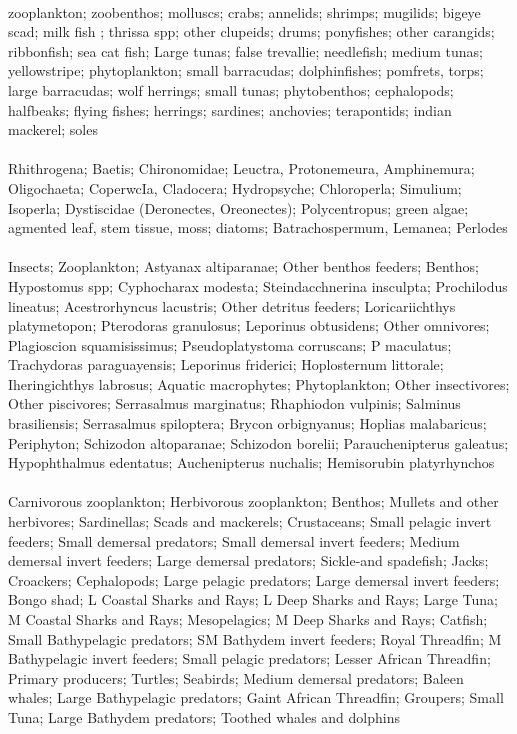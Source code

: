 \fullhline
\hline
{} \\
\hline
zooplankton; zoobenthos; molluscs; crabs; annelids; shrimps; mugilids; bigeye scad; milk fish ; thrissa spp; other clupeids; drums; ponyfishes; other carangids; ribbonfish; sea cat fish; Large tunas; false trevallie; needlefish; medium tunas; yellowstripe; phytoplankton; small barracudas; dolphinfishes; pomfrets, torps; large barracudas; wolf herrings; small tunas; phytobenthos; cephalopods; halfbeaks; flying fishes; herrings; sardines; anchovies; terapontids; indian mackerel; soles\\
\fullhline
\hline
{} \\
\hline
 Rhithrogena;  Baetis;  Chironomidae;  Leuctra, Protonemeura, Amphinemura;  Oligochaeta;  CoperwcIa, Cladocera;  Hydropsyche;  Chloroperla;  Simulium;  Isoperla;  Dystiscidae (Deronectes, Oreonectes);  Polycentropus;  green algae;  agmented leaf, stem tissue, moss;  diatoms;  Batrachospermum, Lemanea;  Perlodes\\
\fullhline
\hline
{} \\
\hline
Insects; Zooplankton; Astyanax altiparanae; Other benthos feeders; Benthos; Hypostomus spp; Cyphocharax modesta; Steindacchnerina insculpta; Prochilodus lineatus; Acestrorhyncus lacustris; Other detritus feeders; Loricariichthys platymetopon; Pterodoras granulosus; Leporinus obtusidens; Other omnivores; Plagioscion squamisissimus; Pseudoplatystoma corruscans; P maculatus; Trachydoras paraguayensis; Leporinus friderici; Hoplosternum littorale; Iheringichthys labrosus; Aquatic macrophytes; Phytoplankton; Other insectivores; Other piscivores; Serrasalmus marginatus; Rhaphiodon vulpinis; Salminus brasiliensis; Serrasalmus spiloptera; Brycon orbignyanus; Hoplias malabaricus; Periphyton; Schizodon altoparanae; Schizodon borelii; Parauchenipterus galeatus; Hypophthalmus edentatus; Auchenipterus nuchalis; Hemisorubin platyrhynchos\\
\fullhline
\hline
{} \\
\hline
Carnivorous zooplankton; Herbivorous zooplankton; Benthos; Mullets and other herbivores; Sardinellas; Scads and mackerels; Crustaceans; Small pelagic invert feeders; Small demersal predators; Small demersal invert feeders; Medium demersal invert feeders; Large demersal predators; Sickle-and spadefish; Jacks; Croackers; Cephalopods; Large pelagic predators; Large demersal invert feeders; Bongo shad; L Coastal Sharks and Rays; L Deep Sharks and Rays; Large Tuna; M Coastal Sharks and Rays; Mesopelagics; M Deep Sharks and Rays; Catfish; Small Bathypelagic predators; SM Bathydem invert feeders; Royal Threadfin; M Bathypelagic invert feeders; Small pelagic predators; Lesser African Threadfin; Primary producers; Turtles; Seabirds; Medium demersal predators; Baleen whales; Large Bathypelagic predators; Gaint African Threadfin; Groupers; Small Tuna; Large Bathydem predators; Toothed whales and dolphins\\
